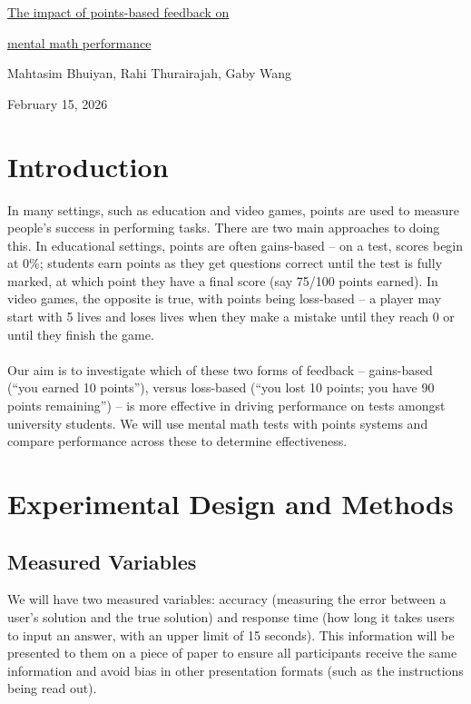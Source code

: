 \documentclass[12pt]{exam}
\author{Mahtasim Bhuiyan, Rahi Thurairajah, Gaby Wang}
\date{February 14, 2026}
\begin{document}
\setlength{\parindent}{0pt}

\begin{center}
\Large{\underline{The impact of points-based feedback on}}

\Large{\underline{mental math performance}}
\end{center}
\begin{center}
Mahtasim Bhuiyan, Rahi Thurairajah, Gaby Wang
\end{center}
\begin{center}
February 15, 2026
\end{center}

\section{Introduction}
In many settings, such as education and video games, points are used to measure people’s success in performing tasks. There are two main approaches to doing this. In educational settings, points are often gains-based -- on a test, scores begin at 0\%; students earn points as they get questions correct until the test is fully marked, at which point they have a final score (say 75/100 points earned). In video games, the opposite is true, with points being loss-based -- a player may start with 5 lives and loses lives when they make a mistake until they reach 0 or until they finish the game.
\\
\\
Our aim is to investigate which of these two forms of feedback -- gains-based (“you earned 10 points”), versus loss-based (“you lost 10 points; you have 90 points remaining”) -- is more effective in driving performance on tests amongst university students. We will use mental math tests with points systems and compare performance across these to determine effectiveness.

\section{Experimental Design and Methods}
\subsection{Measured Variables}
We will have two measured variables: accuracy (measuring the error between a user’s solution and the true solution) and response time (how long it takes users to input an answer, with an upper limit of 15 seconds). This information will be presented to them on a piece of paper to ensure all participants receive the same information and avoid bias in other presentation formats (such as the instructions being read out).
\end{document}
